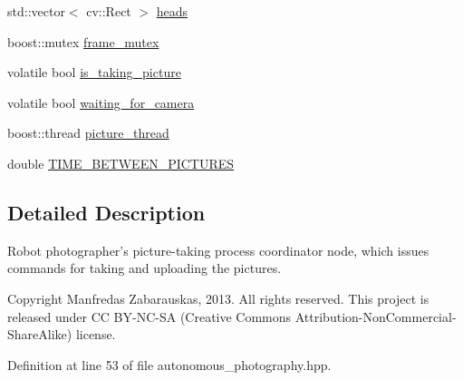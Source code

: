 \begin{DoxyCompactItemize}
\item 
std\-::vector$<$ cv\-::\-Rect $>$ \hyperlink{class_r_p_autonomous_photography_node_a88f3a832bd13409ec9165aeffa502f16}{heads}
\item 
boost\-::mutex \hyperlink{class_r_p_autonomous_photography_node_a871a50679bc8d5792728f687de5f0817}{frame\-\_\-mutex}
\item 
volatile bool \hyperlink{class_r_p_autonomous_photography_node_afc90599505fdcb085495d06d7edbd293}{is\-\_\-taking\-\_\-picture}
\item 
volatile bool \hyperlink{class_r_p_autonomous_photography_node_a91af5773992cc4767fb0f2737449c6f0}{waiting\-\_\-for\-\_\-camera}
\item 
boost\-::thread \hyperlink{class_r_p_autonomous_photography_node_a21212629a7d966ca325c5ac6fad47c0e}{picture\-\_\-thread}
\item 
double \hyperlink{class_r_p_autonomous_photography_node_a707507f69bb3d4d5ea065fef6a611f56}{\-T\-I\-M\-E\-\_\-\-B\-E\-T\-W\-E\-E\-N\-\_\-\-P\-I\-C\-T\-U\-R\-E\-S}
\end{DoxyCompactItemize}


\subsection{\-Detailed \-Description}
\-Robot photographer's picture-\/taking process coordinator node, which issues commands for taking and uploading the pictures. 

\begin{DoxyCopyright}{\-Copyright}
\-Manfredas \-Zabarauskas, 2013. \-All rights reserved. \-This project is released under \-C\-C \-B\-Y-\/\-N\-C-\/\-S\-A (\-Creative \-Commons \-Attribution-\/\-Non\-Commercial-\/\-Share\-Alike) license. 
\end{DoxyCopyright}


\-Definition at line 53 of file autonomous\-\_\-photography.\-hpp.



